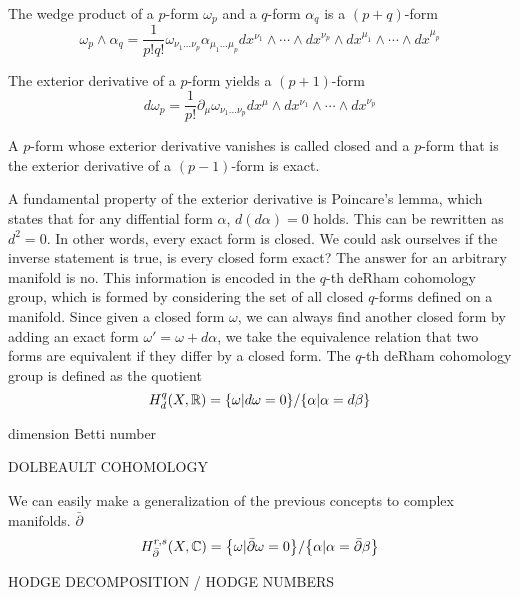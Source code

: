 The wedge product of a $p$-form $\omega_p$ and a $q$-form $\alpha_q$ is a $(p+q)$-form
\begin{equation}
  \omega_p \wedge \alpha_q  = \frac{1}{p!q!}\omega_{\nu_1\ldots\nu_p}
\alpha_{\mu_1\ldots\mu_p}dx^{\nu_1}\wedge \cdots  \wedge dx^{\nu_p}\wedge dx^{\mu_1}\wedge \cdots  \wedge dx^{\mu_p} 
\end{equation}

The exterior derivative of a $p$-form yields a $(p+1)$-form
\begin{equation}
  d\omega_p = \frac{1}{p!}\partial_\mu \omega_{\nu_1\ldots\nu_p}dx^\mu\wedge dx^{\nu_1}\wedge\cdots\wedge dx^{\nu_p}
\end{equation}

A $p$-form whose exterior derivative vanishes is called closed and a $p$-form that is the exterior derivative
of a $(p-1)$-form is exact.

A fundamental property of the exterior derivative is Poincare's lemma, which states that for any diffential form $\alpha$, $d(d\alpha)=0$ holds.
This can be rewritten as $d^2=0$. In other words, every exact form is closed.
We could ask ourselves if the inverse statement is true, 
is every closed form exact?
The answer for an arbitrary manifold is no.%
This information is encoded in the $q$-th deRham cohomology group, which is formed by considering
the set of all closed $q$-forms defined on a manifold.
Since given a closed form $\omega$, we can always find another closed form by adding an exact form
$\omega' = \omega+d\alpha$, we take the equivalence relation that two forms are equivalent if
they differ by a closed form.
The $q$-th deRham cohomology group is defined as the quotient
\begin{equation}
  H^q_d(X,\mathbb R)=\qty{\omega| d\omega=0}/\qty{\alpha|\alpha=d\beta}
\end{equation}

dimension Betti number

DOLBEAULT COHOMOLOGY

We can easily make a generalization of the previous concepts to complex manifolds.
$\bar\partial$
\begin{equation}
  H^{r,s}_{\bar \partial }(X,\mathbb C)=\qty {\omega | \bar \partial \omega= 0}/\qty{\alpha|\alpha=\bar\partial \beta}
\end{equation}

HODGE DECOMPOSITION / HODGE NUMBERS


